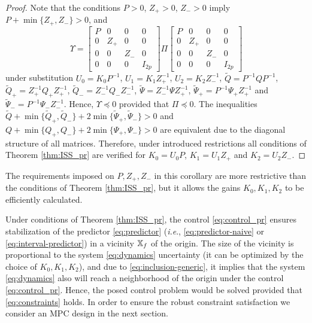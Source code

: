 \documentclass[letterpaper, 10 pt, conference]{ieeeconf}  %
\begin{document}
\begin{proof}
Note that the conditions $P>0$, $Z_{+}>0$, $Z_{-}>0$ imply $P+\min\{Z_{+},Z_{-}\}>0$,
and 
\[
\Upsilon=\left[\begin{array}{cccc}
P & 0 & 0 & 0\\
0 & Z_{+} & 0 & 0\\
0 & 0 & Z_{-} & 0\\
0 & 0 & 0 & I_{2p}
\end{array}\right]\Pi\left[\begin{array}{cccc}
P & 0 & 0 & 0\\
0 & Z_{+} & 0 & 0\\
0 & 0 & Z_{-} & 0\\
0 & 0 & 0 & I_{2p}
\end{array}\right]
\]
under substitution $U_{0}=K_{0}P^{-1}$, $U_{1}=K_{1}Z_{+}^{-1}$,
$U_{2}=K_{2}Z_{-}^{-1}$, $\tilde{Q}=P^{-1}QP^{-1}$, $\tilde{Q}_{+}=Z_{+}^{-1}Q_{+}Z_{+}^{-1}$,
$\tilde{Q}_{-}=Z_{-}^{-1}Q_{-}Z_{-}^{-1}$, $\tilde{\Psi}=Z_{-}^{-1}\Psi Z_{+}^{-1}$,
$\tilde{\Psi}_{+}=P^{-1}\Psi_{+}Z_{+}^{-1}$ and $\tilde{\Psi}_{-}=P^{-1}\Psi_{-}Z_{-}^{-1}$.
Hence, $\Upsilon\preceq0$ provided that $\Pi\preceq0$. The inequalities
$\tilde{Q}+\min\{\tilde{Q}_{+},\tilde{Q}_{-}\}+2\min\{\tilde{\Psi}_{+},\tilde{\Psi}_{-}\}>0$
and $Q+\min\{Q_{+},Q_{-}\}+2\min\{\Psi_{+},\Psi_{-}\}>0$ are equivalent
due to the diagonal structure of all matrices. Therefore, under introduced
restrictions all conditions of Theorem \ref{thm:ISS_pr} are verified
for $K_{0}=U_{0}P$, $K_{1}=U_{1}Z_{+}$ and $K_{2}=U_{2}Z_{-}$.
\end{proof}
The requirements imposed on $P,Z_{+},Z_{-}$ in this corollary are
more restrictive than the conditions of Theorem \ref{thm:ISS_pr},
but it allows the gains $K_{0},K_{1},K_{2}$ to be efficiently calculated.

Under conditions of Theorem \ref{thm:ISS_pr}, the control \eqref{eq:control_pr}
ensures stabilization of the predictor \eqref{eq:predictor} (\emph{i.e}.,
\eqref{eq:predictor-naive} or \eqref{eq:interval-predictor}) in
a vicinity $\mathbb{X}_{f}$ of the origin. The size of the vicinity is proportional
to the system \eqref{eq:dynamics} uncertainty (it can be optimized
by the choice of $K_{0},K_{1},K_{2}$), and due to \eqref{eq:inclusion-generic},
it implies that the system \eqref{eq:dynamics} also will reach a
neighborhood of the origin under the control \eqref{eq:control_pr}.
Hence, the posed control problem would be solved provided that \eqref{eq:constraints}
holds. In order to ensure the robust constraint satisfaction we
consider an MPC design in the next section.
\end{document}

